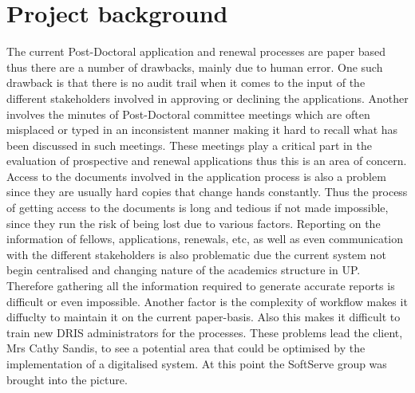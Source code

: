 \documentclass[12pt]{article}
\begin{document}
\section{Project background}
\vspace{0.2in}
The current Post-Doctoral application and renewal processes are paper based thus there are a number of drawbacks, mainly due to human error. One such drawback is that there is no audit trail when it comes to the input of the different stakeholders involved in approving or declining the applications. Another involves the minutes of Post-Doctoral committee meetings which are often misplaced or typed in an inconsistent manner making it hard to recall what has been discussed in such meetings. These meetings play a critical part in the evaluation of prospective and renewal applications thus this is an area of concern. Access to the documents involved in the application process is also a problem since they are usually hard copies that change hands constantly. Thus the process of getting access to the documents is long and tedious if not made impossible, since they run the risk of being lost due to various factors. Reporting on the information of fellows, applications, renewals, etc, as well as even communication with the different stakeholders is also problematic due the current system not begin centralised and changing nature of the academics structure in UP. Therefore gathering all the information required to generate accurate reports is difficult or even impossible. Another factor is the complexity of workflow makes it diffuclty to maintain it on the current paper-basis. Also this makes it difficult to train new DRIS administrators for the processes. These problems lead the client, Mrs Cathy Sandis, to see a potential area that could be optimised by the implementation of a digitalised system. At this point the SoftServe group was brought into the picture.
\vspace{0.5in}

\newpage
\end{document}
